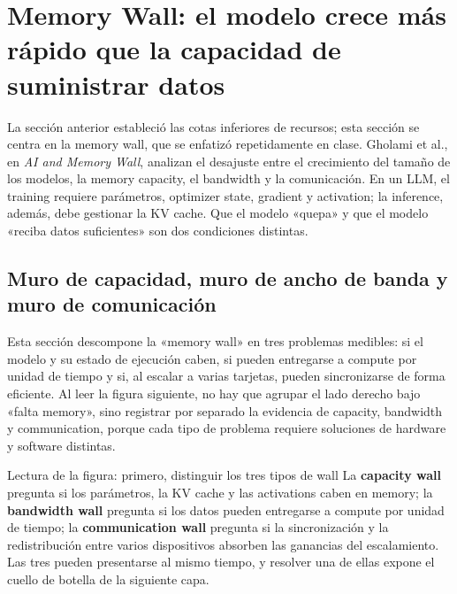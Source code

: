 \section{Memory Wall: el modelo crece más rápido que la capacidad de suministrar datos}

La sección anterior estableció las cotas inferiores de recursos; esta sección se centra en la memory wall, que se enfatizó repetidamente en clase. Gholami et al., en \emph{AI and Memory Wall}, analizan el desajuste entre el crecimiento del tamaño de los modelos, la memory capacity, el bandwidth y la comunicación. En un LLM, el training requiere parámetros, optimizer state, gradient y activation; la inference, además, debe gestionar la KV cache. Que el modelo «quepa» y que el modelo «reciba datos suficientes» son dos condiciones distintas.

\subsection{Muro de capacidad, muro de ancho de banda y muro de comunicación}

Esta sección descompone la «memory wall» en tres problemas medibles: si el modelo y su estado de ejecución caben, si pueden entregarse a compute por unidad de tiempo y si, al escalar a varias tarjetas, pueden sincronizarse de forma eficiente. Al leer la figura siguiente, no hay que agrupar el lado derecho bajo «falta memory», sino registrar por separado la evidencia de capacity, bandwidth y communication, porque cada tipo de problema requiere soluciones de hardware y software distintas.


\begin{knowledgebox}{Lectura de la figura: primero, distinguir los tres tipos de wall}
La \textbf{capacity wall} pregunta si los parámetros, la KV cache y las activations caben en memory; la \textbf{bandwidth wall} pregunta si los datos pueden entregarse a compute por unidad de tiempo; la \textbf{communication wall} pregunta si la sincronización y la redistribución entre varios dispositivos absorben las ganancias del escalamiento. Las tres pueden presentarse al mismo tiempo, y resolver una de ellas expone el cuello de botella de la siguiente capa.
\end{knowledgebox}

